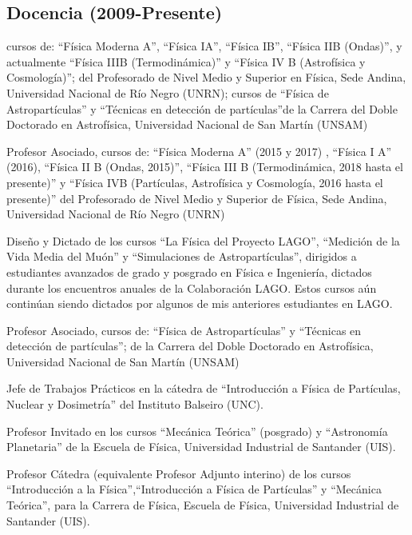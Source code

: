 \subsection*{Docencia (2009-Presente)}
\begin{description}
\ifres
	\item [Profesor Asociado] cursos de: ``Física Moderna A'', ``Física IA'', ``Física IB'', ``Física IIB (Ondas)'', y actualmente ``Física IIIB (Termodinámica)'' y ``Física IV B (Astrofísica y Cosmología)''; del Profesorado de Nivel Medio y Superior en Física, Sede Andina, Universidad Nacional de Río Negro (UNRN); cursos de ``Física de Astropartículas'' y ``Técnicas en detección de partículas''de la Carrera del Doble Doctorado en Astrofísica, Universidad Nacional de San Martín (UNSAM)
\else
	\item [2015-presente] Profesor Asociado, cursos de: ``Física Moderna A'' (2015 y 2017) , ``Física I A'' (2016), ``Física II B (Ondas, 2015)'', ``Física III B (Termodinámica, 2018 hasta el presente)'' y ``Física IVB (Partículas, Astrofísica y Cosmología, 2016 hasta el presente)'' del Profesorado de Nivel Medio y Superior de Física, Sede Andina, Universidad Nacional de Río Negro (UNRN)
	\item [2012-2020] Diseño y Dictado de los cursos ``La Física del Proyecto LAGO'', ``Medición de la Vida Media del Muón'' y ``Simulaciones de Astropartículas'', dirigidos a estudiantes avanzados de grado y posgrado en Física e Ingeniería, dictados durante los encuentros anuales de la Colaboración LAGO. Estos cursos aún continúan siendo dictados por algunos de mis anteriores estudiantes en LAGO.
	\item [2018-2021] Profesor Asociado, cursos de: ``Física de Astropartículas'' y ``Técnicas en detección de partículas''; de la Carrera del Doble Doctorado en Astrofísica, Universidad Nacional de San Martín (UNSAM)
 	\item [2015-2017] Jefe de Trabajos Prácticos en la cátedra de ``Introducción a Física de Partículas, Nuclear y Dosimetría'' del Instituto Balseiro (UNC).
	\item [2014-2015] Profesor Invitado en los cursos ``Mecánica Teórica'' (posgrado) y ``Astronomía Planetaria'' de la Escuela de Física, Universidad Industrial de Santander (UIS).
	\item [2013-2014] Profesor Cátedra (equivalente Profesor Adjunto interino) de los cursos ``Introducción a la Física'',``Introducción a Física de Partículas'' y ``Mecánica Teórica'', para la Carrera de Física, Escuela de Física, Universidad Industrial de Santander (UIS).

\end{description}
